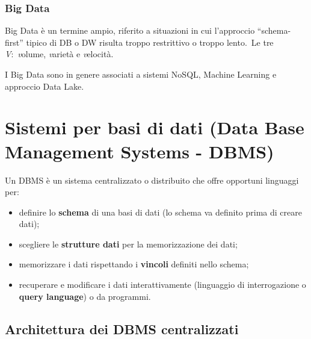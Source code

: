 \subsubsection{Big Data}

Big Data è un termine ampio, riferito a situazioni in cui l'approccio ``schema-first'' tipico di DB o DW risulta troppo restrittivo o troppo lento.\
Le tre \textit{V}:\ \textit{v}olume, \textit{v}arietà e \textit{v}elocità.\

I Big Data sono in genere associati a sistemi NoSQL, Machine Learning e approccio Data Lake.

\section{Sistemi per basi di dati (Data Base Management Systems - DBMS)}

\begin{definition}
	Un DBMS è un sistema centralizzato o distribuito che offre op\-portuni linguaggi per:\
	\begin{itemize}
		\item definire lo \textbf{schema} di una basi di dati (lo schema va definito prima di creare dati);
		\item scegliere le \textbf{strutture dati} per la memorizzazione dei dati;
		\item memorizzare i dati rispettando i \textbf{vincoli} definiti nello schema;
		\item recuperare e modificare i dati interattivamente (linguaggio di interrogazione o \textbf{query language}) o da programmi.
	\end{itemize}
\end{definition}

\subsection{Architettura dei DBMS centralizzati}

